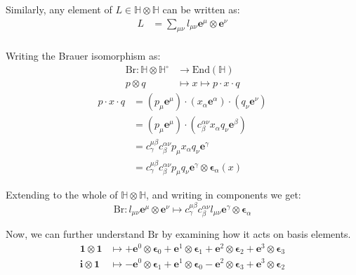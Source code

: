 \documentclass{amsart}
\providecommand{\HH}{\mathbb{H}}
\newcommand{\End}{\mathrm{End}}
\newcommand{\e}{\boldsymbol{e}}
\newcommand{\ep}{\boldsymbol{\epsilon}}
\newcommand{\1}{\boldsymbol{1}}
\renewcommand{\i}{\boldsymbol{i}}
\begin{document}
Similarly, any element of $L \in \HH\otimes\HH$ can be written as:
\begin{align*}
  L &= \sum_{\mu\nu} l_{\mu\nu} \e^\mu \otimes \e^\nu \\
\end{align*}

Writing the Brauer isomorphism as:
\begin{align*}
  \mathrm{Br} : \HH\otimes\HH^\circ &\to \End(\HH) \\
      p \otimes q &\mapsto x \mapsto p\cdot x\cdot q
\end{align*}
\begin{align*}
  p\cdot x\cdot q &= (p_\mu\e^\mu)\cdot(x_\alpha\e^\alpha)\cdot(q_\nu\e^\nu)\\
  &= (p_\mu\e^\mu)\cdot(c^{\alpha\nu}_\beta x_\alpha q_\nu\e^\beta) \\
  &= c^{\mu\beta}_\gamma c^{\alpha\nu}_\beta p_\mu x_\alpha q_\nu\e^\gamma \\
  &= c^{\mu\beta}_\gamma c^{\alpha\nu}_\beta p_\mu q_\nu \e^\gamma\otimes\ep_\alpha (x)
\end{align*}

Extending to the whole of $\HH\otimes\HH$, and writing in components we get:
$$ \mathrm{Br} : l_{\mu\nu}\e^\mu\otimes\e^\nu \mapsto
                 c^{\mu\beta}_\gamma c^{\alpha\nu}_\beta l_{\mu\nu}
                 \e^\gamma\otimes\ep_\alpha $$


Now, we can further understand $\mathrm{Br}$ by examining how it acts on basis
elements.
\begin{align*}
  \1\otimes\1 &\mapsto + \e^0\otimes\ep_0 + \e^1\otimes\ep_1 + \e^2\otimes\ep_2 + \e^3\otimes\ep_3 \\
  \i\otimes\1 &\mapsto - \e^0\otimes\ep_1 + \e^1\otimes\ep_0 - \e^2\otimes\ep_3 + \e^3\otimes\ep_2 \\
\end{align*}
\end{document}
